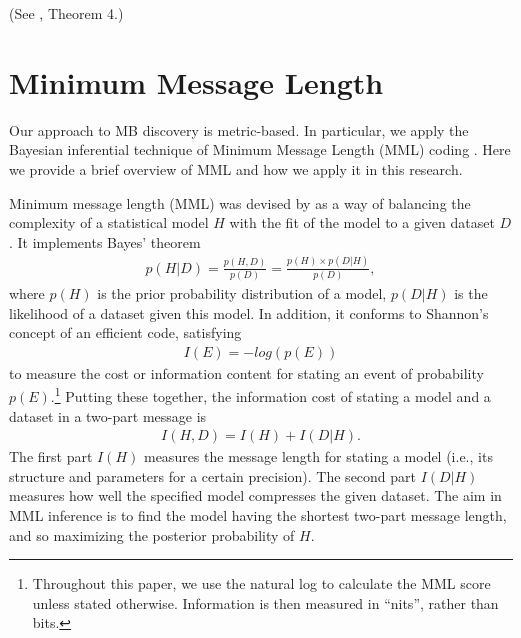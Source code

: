 \documentclass{svmult}
\begin{document}
\noindent
(See \citet{pearl1988probabilistic}, Theorem 4.)

\section{Minimum Message Length} 
\label{sec:mml}

Our approach to MB discovery is metric-based. In particular, we apply
the Bayesian inferential technique of Minimum Message Length (MML)
coding \citep{Allison2018}. Here we provide a brief overview of MML
and how we apply it in this research.

Minimum message length (MML) was devised by \citet{wallace1968} as a
way of balancing the complexity of a statistical model $H$ with the
fit of the model to a given dataset $D$.  It implements Bayes' theorem
\begin{align*}
p(H|D) = \frac{p(H, D)}{p(D)} = \frac{p(H) \times p(D|H)}{p(D)},
\end{align*}
where $p(H)$ is the prior probability distribution of a model,
$p(D|H)$ is the likelihood of a dataset given this model. In addition,
it conforms to Shannon's concept of an efficient code, satisfying
\begin{align*}
I(E) = -log(p(E))
\end{align*}
to measure the cost or information content for stating an event of
probability $p(E)$.\footnote{Throughout this paper, we use the natural
  log to calculate the MML score unless stated otherwise. Information
  is then measured in ``nits'', rather than bits.} Putting these
together, the information cost of stating a model and a dataset in a
two-part message is
\begin{align}
\label{eq:mml}
I(H, D) = I(H) + I(D|H).
\end{align}
The first part $I(H)$ measures the message length for stating a model
(i.e., its structure and parameters for a certain precision). The
second part $I(D|H)$ measures how well the specified model compresses the given
dataset. The aim in MML inference is to find the model having the
shortest two-part message length, and so maximizing the posterior probability
of $H$. 
\end{document}
